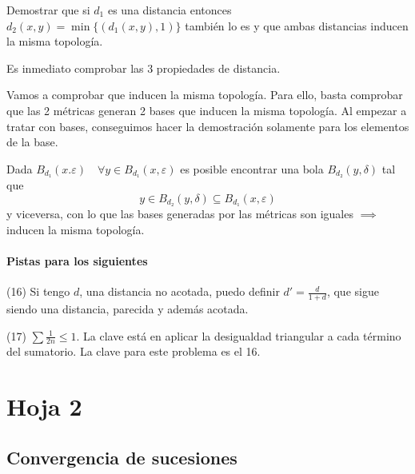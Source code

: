 \begin{problem}[15]
Demostrar que si $d_1$ es una distancia entonces $d_2(x, y) = \min\{ (d_1(x, y), 1)\}$ también lo es y que ambas distancias inducen la misma topología.
\solution

Es inmediato comprobar las 3 propiedades de distancia.

Vamos a comprobar que inducen la misma topología. Para ello, basta comprobar que las 2 métricas generan 2 bases que inducen la misma topología. Al empezar a tratar con bases, conseguimos hacer la demostración solamente para los elementos de la base.

Dada $B_{d₁}(x.ε)\quad ∀y∈B_{d₁}(x,ε)$ es posible encontrar una bola $B_{d₂}(y,δ)$ tal que $$y∈B_{d₂}(y,δ) \subseteq B_{d₁}(x,ε)$$ y viceversa, con lo que las bases generadas por las métricas son iguales $\implies$ inducen la misma topología.
\end{problem}

\paragraph{Pistas para los siguientes}

(16) Si tengo $d$, una distancia no acotada, puedo definir $d'=\frac{d}{1+d}$, que sigue siendo una distancia, parecida y además acotada.

(17) $\sum \frac{1}{2n} \leq 1$. La clave está en aplicar la desigualdad triangular a cada término del sumatorio. La clave para este problema es el 16.



\section{Hoja 2}

\subsection{Convergencia de sucesiones}

